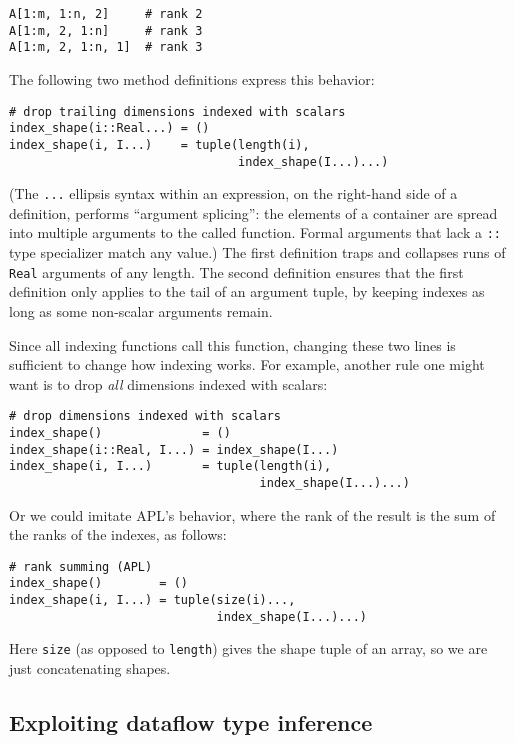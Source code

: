 \documentclass[preprint]{sigplanconf}
\newcommand{\code}[1]{\texttt{#1}}
\begin{document}
\begin{verbatim}
A[1:m, 1:n, 2]     # rank 2
A[1:m, 2, 1:n]     # rank 3
A[1:m, 2, 1:n, 1]  # rank 3
\end{verbatim}

The following two method definitions express this behavior:

{\small
\begin{verbatim}
# drop trailing dimensions indexed with scalars
index_shape(i::Real...) = ()
index_shape(i, I...)    = tuple(length(i),
                                index_shape(I...)...)
\end{verbatim}
}
(The \code{...} ellipsis syntax within an expression, on the right-hand side of
a definition, performs ``argument splicing'': the elements of a container
are spread into multiple arguments to the called function. Formal
arguments that lack a \code{::} type specializer match any value.)
The first definition traps and collapses runs of \code{Real} arguments of
any length. The second definition ensures that the first definition only
applies to the tail of an argument tuple, by keeping indexes as long as
some non-scalar arguments remain.

Since all indexing functions call this function, changing these two lines is
sufficient to change how indexing works. For example, another rule one might
want is to drop \emph{all} dimensions indexed with scalars:

{\small
\begin{verbatim}
# drop dimensions indexed with scalars
index_shape()              = ()
index_shape(i::Real, I...) = index_shape(I...)
index_shape(i, I...)       = tuple(length(i),
                                   index_shape(I...)...)
\end{verbatim}
}

Or we could imitate APL's behavior, where the rank of the result is the sum
of the ranks of the indexes, as follows:

{\small
\begin{verbatim}
# rank summing (APL)
index_shape()        = ()
index_shape(i, I...) = tuple(size(i)...,
                             index_shape(I...)...)
\end{verbatim}
}

Here \code{size} (as opposed to \code{length}) gives the shape tuple of an array,
so we are just concatenating shapes.


\subsection{Exploiting dataflow type inference}
\end{document}
